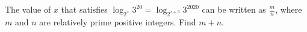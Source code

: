 The value of $x$ that satisfies $\log_{2^x} 3^{20} = \log_{2^{x+3}} 3^{2020}$ can be written as $\frac{m}{n}$, where $m$ and $n$ are relatively prime positive integers. Find $m+n$.